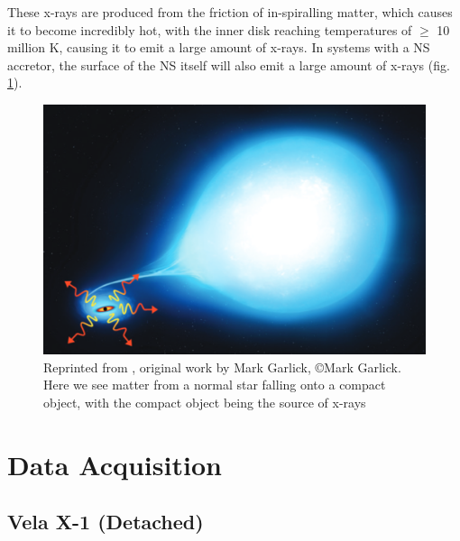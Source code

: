 \documentclass[12pt, a4paper]{article}
\begin{document}
            These x-rays are produced from the friction of in-spiralling matter, which causes it to become incredibly hot, with the inner disk reaching temperatures of $\geq$ 10 million K, causing it to emit a large amount of x-rays. In systems with a NS accretor, the surface of the NS itself will also emit a large amount of x-rays \parencite{TaurisvandenHeuvel+2023} (fig. \ref{XrayAccretionMarkVis}). 

            \begin{figure} [H]
                \centering
                \includegraphics[width=\textwidth]{figs/reused-figs/markGarlic-Xrayaccretion.png}
                \caption{Reprinted from \parencite{TaurisvandenHeuvel+2023}, original work by Mark Garlick, \copyright Mark Garlick. Here we see matter from a normal star falling onto a compact object, with the compact object being the source of x-rays}
                \label{XrayAccretionMarkVis}
            \end{figure}
        
\section{\centering Data Acquisition}
    \subsection{\centering Vela X-1 (Detached)} \label{velax1introduction}
    
\end{document}
